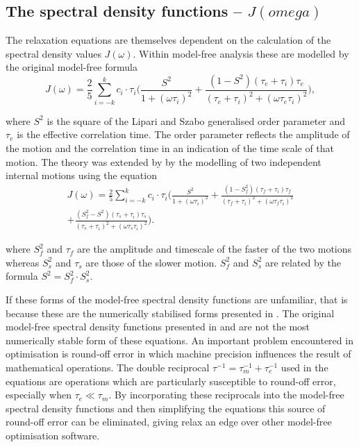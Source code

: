 \begin{htmlonly}
\begin{htmlonly}
\begin{htmlonly}
    \subsection{The spectral density functions -- $J(omega)$}
\end{htmlonly}

The relaxation equations are themselves dependent on the calculation of the spectral density values $J(\omega)$.  Within model-free analysis these are modelled by the original model-free formula \citep{LipariSzabo82a, LipariSzabo82b}
\begin{equation} \label{eq: J(w) model-free generic}
    J(\omega) = \frac{2}{5} \sum_{i=-k}^k c_i \cdot \tau_i \Bigg(
        \frac{S^2}{1 + (\omega \tau_i)^2}
        + \frac{(1 - S^2)(\tau_e + \tau_i)\tau_e}{(\tau_e + \tau_i)^2 + (\omega \tau_e \tau_i)^2}
    \Bigg),
\end{equation}

\noindent where $S^2$ is the square of the Lipari and Szabo generalised order parameter and $\tau_e$ is the effective correlation time.  The order parameter reflects the amplitude of the motion and the correlation time in an indication of the time scale of that motion.  The theory was extended by \citet{Clore90a} by the modelling of two independent internal motions using the equation
\begin{multline} \label{eq: J(w) model-free ext generic}
    J(\omega) = \frac{2}{5} \sum_{i=-k}^k c_i \cdot \tau_i \Bigg(
        \frac{S^2}{1 + (\omega \tau_i)^2}
        + \frac{(1 - S^2_f)(\tau_f + \tau_i)\tau_f}{(\tau_f + \tau_i)^2 + (\omega \tau_f \tau_i)^2}       \\
        + \frac{(S^2_f - S^2)(\tau_s + \tau_i)\tau_s}{(\tau_s + \tau_i)^2 + (\omega \tau_s \tau_i)^2}
    \Bigg).
\end{multline}

\noindent where $S^2_f$ and $\tau_f$ are the amplitude and timescale of the faster of the two motions whereas $S^2_s$ and $\tau_s$ are those of the slower motion.  $S^2_f$ and $S^2_s$ are related by the formula $S^2 = S^2_f \cdot S^2_s$.

If these forms of the model-free spectral density functions are unfamiliar, that is because these are the numerically stabilised forms presented in \citet{dAuvergneGooley08a}.  The original model-free spectral density functions presented in \citet{LipariSzabo82a} and \citet{Clore90a} are not the most numerically stable form of these equations.  An important problem encountered in optimisation is round-off error in which machine precision influences the result of mathematical operations.  The double reciprocal $\tau^{-1} = \tau_m^{-1} + \tau_e^{-1}$ used in the equations are operations which are particularly susceptible to round-off error, especially when $\tau_e \ll \tau_m$.  By incorporating these reciprocals into the model-free spectral density functions and then simplifying the equations this source of round-off error can be eliminated, giving relax an edge over other model-free optimisation software.



\end{htmlonly}
\end{htmlonly}
